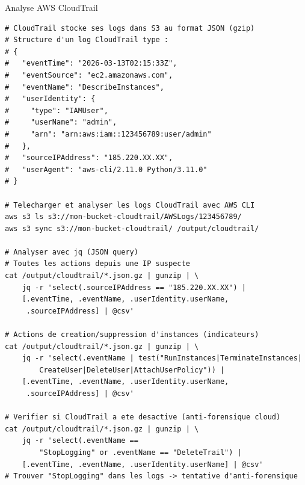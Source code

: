\begin{boxoutils}{Analyse AWS CloudTrail}
\begin{lstlisting}[language=bash_forensique]
# CloudTrail stocke ses logs dans S3 au format JSON (gzip)
# Structure d'un log CloudTrail type :
# {
#   "eventTime": "2026-03-13T02:15:33Z",
#   "eventSource": "ec2.amazonaws.com",
#   "eventName": "DescribeInstances",
#   "userIdentity": {
#     "type": "IAMUser",
#     "userName": "admin",
#     "arn": "arn:aws:iam::123456789:user/admin"
#   },
#   "sourceIPAddress": "185.220.XX.XX",
#   "userAgent": "aws-cli/2.11.0 Python/3.11.0"
# }

# Telecharger et analyser les logs CloudTrail avec AWS CLI
aws s3 ls s3://mon-bucket-cloudtrail/AWSLogs/123456789/
aws s3 sync s3://mon-bucket-cloudtrail/ /output/cloudtrail/

# Analyser avec jq (JSON query)
# Toutes les actions depuis une IP suspecte
cat /output/cloudtrail/*.json.gz | gunzip | \
    jq -r 'select(.sourceIPAddress == "185.220.XX.XX") |
    [.eventTime, .eventName, .userIdentity.userName,
     .sourceIPAddress] | @csv'

# Actions de creation/suppression d'instances (indicateurs)
cat /output/cloudtrail/*.json.gz | gunzip | \
    jq -r 'select(.eventName | test("RunInstances|TerminateInstances|
        CreateUser|DeleteUser|AttachUserPolicy")) |
    [.eventTime, .eventName, .userIdentity.userName,
     .sourceIPAddress] | @csv'

# Verifier si CloudTrail a ete desactive (anti-forensique cloud)
cat /output/cloudtrail/*.json.gz | gunzip | \
    jq -r 'select(.eventName ==
        "StopLogging" or .eventName == "DeleteTrail") |
    [.eventTime, .eventName, .userIdentity.userName] | @csv'
# Trouver "StopLogging" dans les logs -> tentative d'anti-forensique
\end{lstlisting}
\end{boxoutils}

